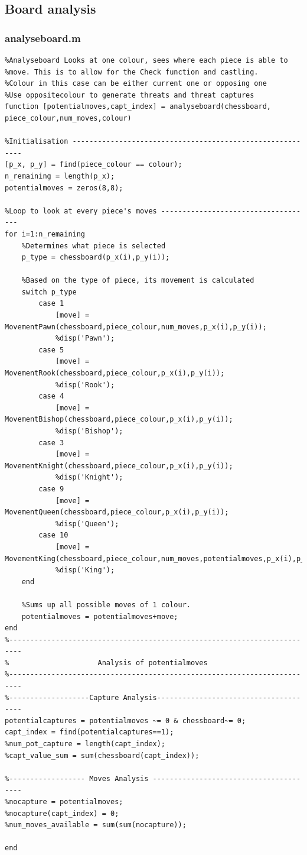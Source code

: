 \documentclass[11pt,a4paper]{article}
\begin{document}
\subsection{Board analysis}
\subsubsection{analyseboard.m}
\begin{lstlisting}
%Analyseboard Looks at one colour, sees where each piece is able to
%move. This is to allow for the Check function and castling.
%Colour in this case can be either current one or opposing one
%Use oppositecolour to generate threats and threat captures
function [potentialmoves,capt_index] = analyseboard(chessboard, piece_colour,num_moves,colour)

%Initialisation ----------------------------------------------------------
[p_x, p_y] = find(piece_colour == colour);
n_remaining = length(p_x);
potentialmoves = zeros(8,8);

%Loop to look at every piece's moves ------------------------------------
for i=1:n_remaining
    %Determines what piece is selected
    p_type = chessboard(p_x(i),p_y(i)); 
    
    %Based on the type of piece, its movement is calculated
    switch p_type
        case 1
            [move] = MovementPawn(chessboard,piece_colour,num_moves,p_x(i),p_y(i));
            %disp('Pawn');
        case 5
            [move] = MovementRook(chessboard,piece_colour,p_x(i),p_y(i));
            %disp('Rook');
        case 4
            [move] = MovementBishop(chessboard,piece_colour,p_x(i),p_y(i));
            %disp('Bishop');
        case 3
            [move] = MovementKnight(chessboard,piece_colour,p_x(i),p_y(i));
            %disp('Knight');
        case 9
            [move] = MovementQueen(chessboard,piece_colour,p_x(i),p_y(i));
            %disp('Queen');
        case 10
            [move] = MovementKing(chessboard,piece_colour,num_moves,potentialmoves,p_x(i),p_y(i));
            %disp('King');
    end
    
    %Sums up all possible moves of 1 colour.
    potentialmoves = potentialmoves+move;
end
%-------------------------------------------------------------------------
%                     Analysis of potentialmoves
%-------------------------------------------------------------------------
%-------------------Capture Analysis--------------------------------------
potentialcaptures = potentialmoves ~= 0 & chessboard~= 0;
capt_index = find(potentialcaptures==1);
%num_pot_capture = length(capt_index);
%capt_value_sum = sum(chessboard(capt_index));

%------------------ Moves Analysis ---------------------------------------
%nocapture = potentialmoves;
%nocapture(capt_index) = 0;
%num_moves_available = sum(sum(nocapture));

end
\end{lstlisting}
\end{document}
